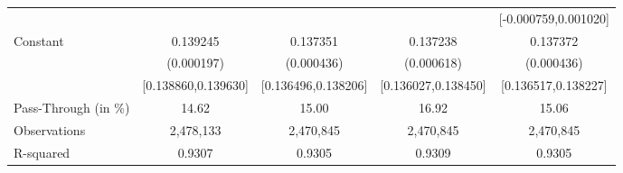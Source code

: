 {\begin{tabular}{l*{4}{c}}
                    &                     &                     &                     &[-0.000759,0.001020]         \\
Constant            &    0.139245\sym{***}&    0.137351\sym{***}&    0.137238\sym{***}&    0.137372\sym{***}\\
                    &  (0.000197)         &  (0.000436)         &  (0.000618)         &  (0.000436)         \\
                    &[0.138860,0.139630]         &[0.136496,0.138206]         &[0.136027,0.138450]         &[0.136517,0.138227]         \\
\midrule
Pass-Through (in \%)&       14.62         &       15.00         &       16.92         &       15.06         \\
Observations        &   2,478,133         &   2,470,845         &   2,470,845         &   2,470,845         \\
R-squared           &      0.9307         &      0.9305         &      0.9309         &      0.9305         \\
\bottomrule
\end{tabular}
}
